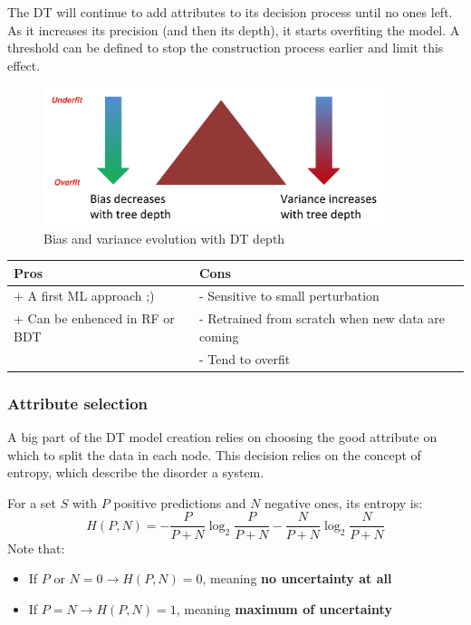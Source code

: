 The DT will continue to add attributes to its decision process until no ones left. As it increases its precision (and then its depth), it starts overfiting the model. A threshold can be defined to stop the construction process earlier and limit this effect. 

\begin{figure}[H]%
 \centering
 \includegraphics[width=10cm]{./img/07/bias_variance_DT.png}
 \caption{\label{pic:bias_variance_DT.} Bias and variance evolution with DT depth}
\end{figure}

\begin{center} %
\begin{tabular} {| l | l |}
\hline
\bf Pros & \bf Cons \\ \hline
+ A first ML approach ;) & - Sensitive to small perturbation  \\
+ Can be enhenced in RF or BDT  & - Retrained from scratch when new data are coming \\
 & - Tend to overfit \\ 
\hline
\end{tabular}
\end{center}



\subsubsection{Attribute selection}
\label{sec:selection}

A big part of the DT model creation relies on choosing the good attribute on which to split the data in each node. This decision relies on the concept of entropy, which describe the disorder a system.

For a set $S$ with $P$ positive predictions and $N$ negative ones, its entropy is:
$$
 H(P,N)=-\frac{P}{P+N}\log_2\frac{P}{P+N}-\frac{N}{P+N}\log_2\frac{N}{P+N}
$$
Note that:
\begin{itemize}
 \item If $P \text{ or } N=0 \rightarrow H(P,N)=0$, meaning \textbf{no uncertainty at all}
 \item If $P=N \rightarrow H(P,N)=1$, meaning \textbf{maximum of uncertainty}
\end{itemize}

